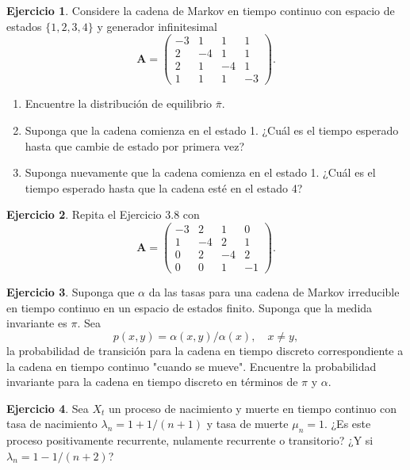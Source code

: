 \documentclass{article}
\theoremstyle{plain}
\theoremstyle{definition}
\newtheorem{Ejercicio}{Ejercicio}[section]
\newcommand{\A}{\mathbf{A}}
\begin{document}
\begin{Ejercicio}
  Considere la cadena de Markov en tiempo continuo con espacio de estados $\{1,2,3,4\}$ y generador infinitesimal
  \[ \A = \begin{pmatrix}
    -3 & 1 & 1 & 1 \\
    2 & -4 & 1 & 1 \\
    2 & 1 & -4 & 1 \\
    1 & 1 & 1 & -3
  \end{pmatrix}. \]
  \begin{enumerate}
    \item Encuentre la distribuci\'on de equilibrio $\bar{\pi}$.
    \item Suponga que la cadena comienza en el estado 1. ¿Cu\'al es el tiempo esperado hasta que cambie de estado por primera vez?
    \item Suponga nuevamente que la cadena comienza en el estado 1. ¿Cu\'al es el tiempo esperado hasta que la cadena est\'e en el estado 4?
  \end{enumerate}
\end{Ejercicio}

\begin{Ejercicio}
  Repita el Ejercicio 3.8 con
  \[ \A = \begin{pmatrix}
    -3 & 2 & 1 & 0 \\
    1 & -4 & 2 & 1 \\
    0 & 2 & -4 & 2 \\
    0 & 0 & 1 & -1
  \end{pmatrix}. \]
\end{Ejercicio}

\begin{Ejercicio}
  Suponga que $\alpha$ da las tasas para una cadena de Markov irreducible en tiempo continuo en un espacio de estados finito. Suponga que la medida invariante es $\pi$. Sea
  \[ p(x,y) = \alpha(x,y)/\alpha(x), \quad x \neq y, \]
  la probabilidad de transici\'on para la cadena en tiempo discreto correspondiente a la cadena en tiempo continuo "cuando se mueve". Encuentre la probabilidad invariante para la cadena en tiempo discreto en t\'erminos de $\pi$ y $\alpha$.
\end{Ejercicio}

\begin{Ejercicio}
  Sea $X_t$ un proceso de nacimiento y muerte en tiempo continuo con tasa de nacimiento $\lambda_n = 1 + 1/(n+1)$ y tasa de muerte $\mu_n = 1$. ¿Es este proceso positivamente recurrente, nulamente recurrente o transitorio? ¿Y si $\lambda_n = 1 - 1/(n+2)$?
\end{Ejercicio}
\end{document}
